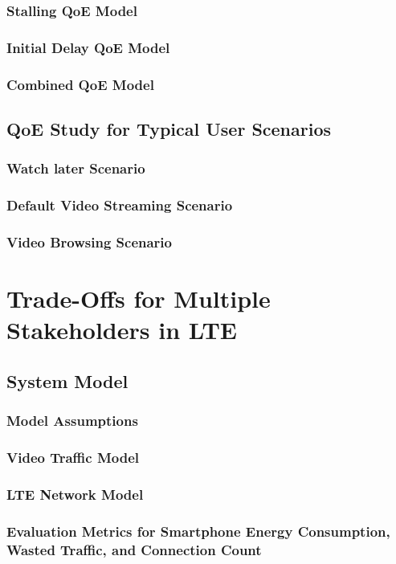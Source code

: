 \subsubsection*{Stalling QoE Model}
\subsubsection*{Initial Delay QoE Model}
\subsubsection*{Combined QoE Model}

\subsection{QoE Study for Typical User Scenarios}
\subsubsection*{Watch later Scenario}
\subsubsection*{Default Video Streaming Scenario}
\subsubsection*{Video Browsing Scenario}

\section{Trade-Offs for Multiple Stakeholders in LTE}
\cite{Schwartz2013b}

\subsection{System Model}
\subsubsection*{Model Assumptions}
\subsubsection*{Video Traffic Model}
\subsubsection*{LTE Network Model}
\subsubsection*{Evaluation Metrics for Smartphone Energy Consumption, Wasted Traffic, and Connection Count}

